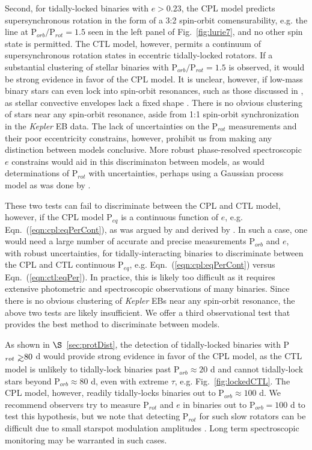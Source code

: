 \documentclass[twocolumn]{aastex61}
\def\gsim{~\rlap{$>$}{\lower 1.0ex\hbox{$\sim$}}}
\newcommand{\kepler}[0]{\textit{Kepler}\xspace}
\begin{document}
Second, for tidally-locked binaries with $e > 0.23$, the CPL model predicts supersynchronous rotation in the form of a 3:2 spin-orbit comensurability, e.g. the line at P$_{orb}/$P$_{rot} = 1.5$ seen in the left panel of Fig.~\ref{fig:lurie7}, and no other spin state is permitted. The CTL model, however, permits a continuum of supersynchronous rotation states in eccentric tidally-locked rotators. If a substantial clustering of stellar binaries with P$_{orb}/$P$_{rot} = 1.5$ is observed, it would be strong evidence in favor of the CPL model. It is unclear, however, if low-mass binary stars can even lock into spin-orbit resonances, such as those discussed in \citet{Rodriguez2012}, as stellar convective envelopes lack a fixed shape \citep{Burkart2014,Lurie2017}.  There is no obvious clustering of stars near any spin-orbit resonance, aside from 1:1 spin-orbit synchronization in the \citet{Lurie2017} \kepler EB data. The lack of uncertainties on the \citet{Lurie2017} P$_{rot}$ measurements and their poor eccentricity constrains, however, prohibit us from making any distinction between models conclusive.  More robust phase-resolved spectroscopic $e$ constrains would aid in this discriminaton between models, as would determinations of P$_{rot}$ with uncertainties, perhaps using a Gaussian process model as was done by \citet{Angus2018}.  

These two tests can fail to discriminate between the CPL and CTL model, however, if the CPL model P$_{eq}$ is a continuous function of $e$, e.g. Eqn.~(\ref{eqn:cpl:eqPerCont}), as was argued by \citet{Goldreich1966b} and derived by \citet{Murray1999}.  In such a case, one would need a large number of accurate and precise measurements P$_{orb}$ and $e$, with robust uncertainties, for tidally-interacting binaries to discriminate between the CPL and CTL continuous P$_{eq}$, e.g. Eqn.~(\ref{eqn:cpl:eqPerCont}) versus Eqn.~(\ref{eqn:ctl:eqPer}).  In practice, this is likely too difficult as it requires extensive photometric and spectroscopic observations of many binaries. Since there is no obvious clustering of \kepler EBs near any spin-orbit resonance, the above two tests are likely insufficient. We offer a third observational test that provides the best method to discriminate between models.

As shown in $\S$~\ref{sec:protDist}, the detection of tidally-locked binaries with P$_{rot} \gsim 80$ d would provide strong evidence in favor of the CPL model, as the CTL model is unlikely to tidally-lock binaries past P$_{orb} \approx 20$ d and cannot tidally-lock stars beyond P$_{orb} \approx 80$ d, even with extreme $\tau$, e.g. Fig.~\ref{fig:lockedCTL}. The CPL model, however, readily tidally-locks binaries out to P$_{orb} \approx 100$ d.  We recommend observers try to measure P$_{rot}$ and $e$ in binaries out to P$_{orb} = 100$ d to test this hypothesis, but we note that detecting P$_{rot}$ for such slow rotators can be difficult due to small starspot modulation amplitudes \citep{Lurie2017,Reinhold2018}. Long term spectroscopic monitoring may be warranted in such cases.
\end{document}

